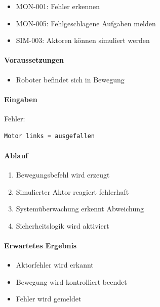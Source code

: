 \documentclass[
  a4paper,
  12pt,
  DIV=12,        %
  parskip=half,  %
  headings=small %
]{scrartcl}
\theoremstyle{definition}
\providecommand{\tightlist}{%
  \setlength{\itemsep}{0pt}\setlength{\parskip}{0pt}}
\theoremstyle{definition}
\begin{document}
\begin{itemize}
\tightlist
\item
  MON-001: Fehler erkennen
\item
  MON-005: Fehlgeschlagene Aufgaben melden
\item
  SIM-003: Aktoren können simuliert werden
\end{itemize}

\paragraph{Voraussetzungen}\label{voraussetzungen-21}

\begin{itemize}
\tightlist
\item
  Roboter befindet sich in Bewegung
\end{itemize}

\paragraph{Eingaben}\label{eingaben-18}

Fehler:

\begin{verbatim}
Motor links = ausgefallen
\end{verbatim}

\paragraph{Ablauf}\label{ablauf-21}

\begin{enumerate}
\def\labelenumi{\arabic{enumi}.}
\tightlist
\item
  Bewegungsbefehl wird erzeugt
\item
  Simulierter Aktor reagiert fehlerhaft
\item
  Systemüberwachung erkennt Abweichung
\item
  Sicherheitslogik wird aktiviert
\end{enumerate}

\paragraph{Erwartetes Ergebnis}\label{erwartetes-ergebnis-21}

\begin{itemize}
\tightlist
\item
  Aktorfehler wird erkannt
\item
  Bewegung wird kontrolliert beendet
\item
  Fehler wird gemeldet
\end{itemize}
\end{document}
